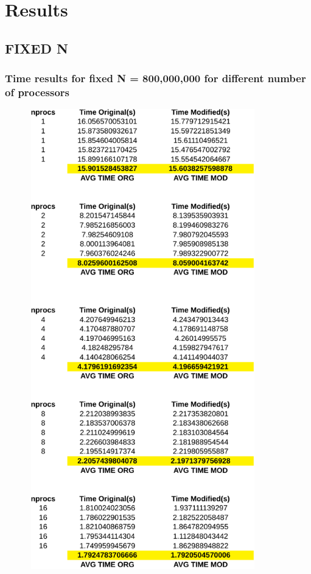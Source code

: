 \documentclass[12pt]{article}
\begin{document}
	\newpage
	\section{Results}
	\subsection{FIXED N}
	\subsubsection{Time results for fixed N = 800,000,000 for different number of processors}

	\begin{center}	
	\includegraphics[width = 120mm,height = 200mm]{fixedN_alltime-crop}
	\end{center}
\end{document}
